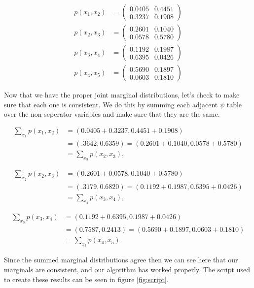 \documentclass[paper=a4, fontsize=11pt]{scrartcl} %
\begin{document}
\begin{align}
p(x_1,x_2) &=
	\begin{pmatrix}
	0.0405 & 0.4451 \\
	0.3237 & 0.1908
	\end{pmatrix} \\
p(x_2,x_3) &=
	\begin{pmatrix}
	0.2601 & 0.1040 \\
    	0.0578 & 0.5780
	\end{pmatrix} \\
p(x_3,x_4) &=
	\begin{pmatrix}
	0.1192  &  0.1987 \\
    	0.6395   & 0.0426
	\end{pmatrix} \\
p(x_4,x_5) &=
	\begin{pmatrix}
	0.5690  &  0.1897 \\
    	0.0603  &  0.1810
	\end{pmatrix}
\end{align}

Now that we have the proper joint marginal distributions, let's check to make sure that each one is consistent.
We do this by summing each adjacent $\psi$ table over the non-seperator variables and make sure that they are the same.

\begin{align}
\sum_{x_1} p(x_1,x_2) &= (0.0405+0.3237,0.4451+0.1908) \\
&= (.3642,0.6359) = (0.2601+0.1040,0.0578+0.5780) \\ 
&= \sum_{x_3} p(x_2,x_3),
\end{align}

\begin{align}
\sum_{x_2} p(x_2,x_3) &= (0.2601+0.0578,0.1040+0.5780) \\
&= (.3179,0.6820) = (0.1192+0.1987,0.6395+0.0426) \\ 
&= \sum_{x_4} p(x_3,x_4),
\end{align}

\begin{align}
\sum_{x_3} p(x_3,x_4) &= (0.1192+0.6395,0.1987+0.0426) \\
&= (0.7587,0.2413) = (0.5690+0.1897,0.0603+0.1810) \\ 
&= \sum_{x_5} p(x_4,x_5).
\end{align}

Since the summed marginal distributions agree then we can see here that our marginals are consistent, and our algorithm has worked properly.
The script used to create these results can be seen in figure \ref{fig:script}.
\end{document}

